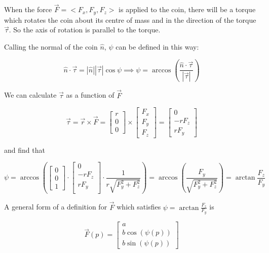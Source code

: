 \documentclass[english,12pt,a4paper,final]{article}
\begin{document}
When the force $\vec{F}=<F_x, F_y, F_z>$ is applied to the coin, there will be a torque which rotates the coin about its centre of mass and in the direction of the torque $\vec{\tau}$. So the axis of rotation is parallel to the torque.

Calling the normal of the coin $\hat{n}$, $\psi$ can be defined in this way:

\begin{equation*}
	\hat{n} \cdot \vec{\tau} = |\hat{n}| |\vec{\tau}| \cos\psi \implies \psi = \arccos\left(\frac{\hat{n}\cdot\vec{\tau}}{|\vec{\tau}|}\right)
\end{equation*}

We can calculate $\vec{\tau}$ as a function of $\vec{F}$

\begin{equation*}
	\vec{\tau} = \vec{r}\times\vec{F} = \begin{bmatrix}r\\0\\0\end{bmatrix} \times \begin{bmatrix}F_x \\ F_y \\ F_z\end{bmatrix} = \begin{bmatrix}0\\-r F_z\\r F_y\end{bmatrix}
\end{equation*}

and find that

\begin{equation*}
	\psi = \arccos \left(\begin{bmatrix}0\\0\\1\end{bmatrix} \cdot \begin{bmatrix}0\\-r F_z\\r F_y\\\end{bmatrix} \cdot \frac{1}{r\sqrt{F_y^2+F_z^2}} \right) = \arccos \left(\frac{F_y}{\sqrt{F_y^2+F_z^2}}\right) = \arctan\frac{F_z}{F_y}
\end{equation*}

A general form of a definition for $\vec{F}$ which satisfies $\psi = \arctan\frac{F_z}{F_y}$ is

\begin{equation*}
	\vec{F}(p) = \begin{bmatrix}a\\b\cos\left(\psi(p)\right)\\b\sin\left(\psi(p)\right)\end{bmatrix}
\end{equation*}
\end{document}

